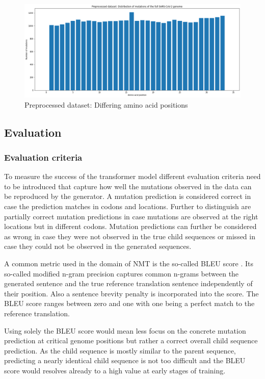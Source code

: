 \begin{figure}[ht]
	\centering
	\includegraphics[width=0.9\linewidth]{figures/preprocessedMutatedGeneticLoci.png}
	\caption{Preprocessed dataset: Differing amino acid positions \cite{own representation}}
	\label{preprocessedMutatedGeneticLoci}
\end{figure}

\newpage
\subsection{Evaluation}  \label{ch:experimentsB}

\subsubsection{Evaluation criteria}

To measure the success of the transformer model different evaluation criteria need to be introduced that capture how well the mutations observed in the data can be reproduced by the generator. A mutation prediction is considered correct in case the prediction matches in codons and locations. Further to distinguish are partially correct mutation predictions in case mutations are observed at the right locations but in different codons. Mutation predictions can further be considered as wrong in case they were not observed in the true child sequences or missed in case they could not be observed in the generated sequences. 

A common metric used in the domain of \ac{NMT} is the so-called \ac{BLEU} score \cite{Papineni2002}. Its so-called modified n-gram precision captures common n-grams between the generated sentence and the true reference translation sentence independently of their position. Also a sentence brevity penalty is incorporated into the score. The \ac{BLEU} score ranges between zero and one with one being a perfect match to the reference translation. \cite{Papineni2002}

Using solely the \ac{BLEU} score would mean less focus on the concrete mutation prediction at critical genome positions but rather a correct overall child sequence prediction. As the child sequence is mostly similar to the parent sequence, predicting a nearly identical child sequence is not too difficult and the \ac{BLEU} score would resolves already to a high value at early stages of training. 

